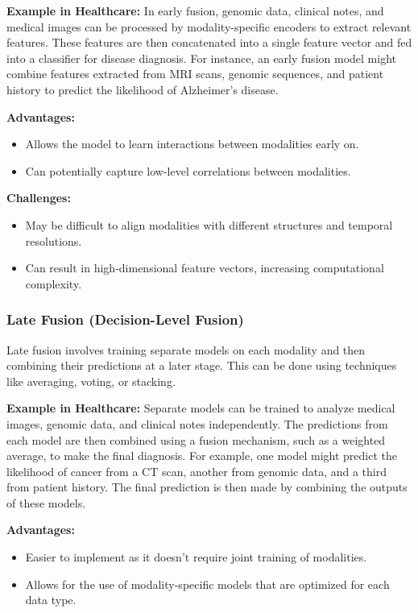 \documentclass[pdflatex,sn-mathphys-num]{sn-jnl}%
\theoremstyle{thmstyleone}%
\theoremstyle{thmstyletwo}%
\theoremstyle{thmstylethree}%
\begin{document}
\begin{itemize}
        \textbf{Example in Healthcare:} In early fusion, genomic data, clinical notes, and medical images can be processed by modality-specific encoders to extract relevant features. These features are then concatenated into a single feature vector and fed into a classifier for disease diagnosis. For instance, an early fusion model might combine features extracted from MRI scans, genomic sequences, and patient history to predict the likelihood of Alzheimer's disease.
        
        \textbf{Advantages:}
        \begin{itemize}
            \item Allows the model to learn interactions between modalities early on.
            \item Can potentially capture low-level correlations between modalities.
        \end{itemize}

        \textbf{Challenges:}
        \begin{itemize}
            \item May be difficult to align modalities with different structures and temporal resolutions.
            \item Can result in high-dimensional feature vectors, increasing computational complexity.
        \end{itemize}
        
       \subsubsection{Late Fusion (Decision-Level Fusion)} 
       Late fusion involves training separate models on each modality and then combining their predictions at a later stage. This can be done using techniques like averaging, voting, or stacking.
        
        \textbf{Example in Healthcare:} Separate models can be trained to analyze medical images, genomic data, and clinical notes independently. The predictions from each model are then combined using a fusion mechanism, such as a weighted average, to make the final diagnosis. For example, one model might predict the likelihood of cancer from a CT scan, another from genomic data, and a third from patient history. The final prediction is then made by combining the outputs of these models.
                
        \textbf{Advantages:}
        \begin{itemize}
            \item Easier to implement as it doesn't require joint training of modalities.
            \item Allows for the use of modality-specific models that are optimized for each data type.
        \end{itemize}


\end{itemize}
\end{document}
